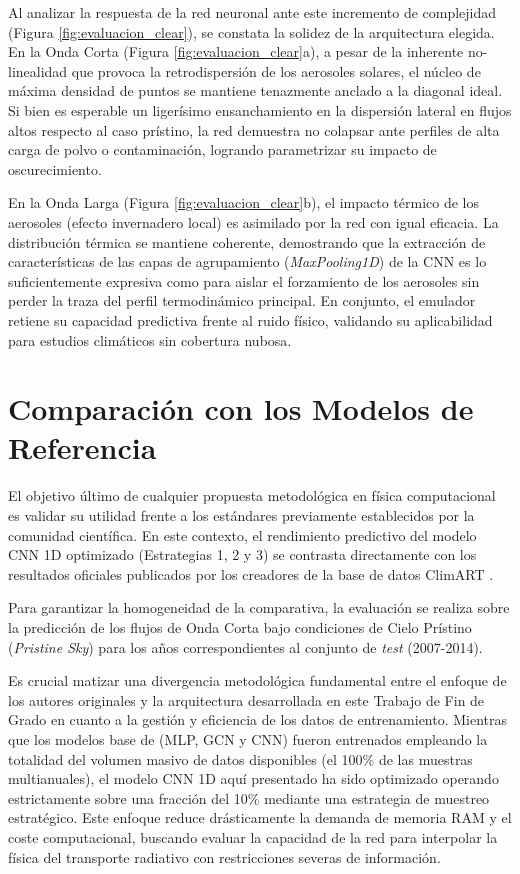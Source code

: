 \documentclass[11pt,a4paper,twoside,pdf]{article}
\numberwithin{equation}{section}
\begin{document}
\newpage

Al analizar la respuesta de la red neuronal ante este incremento de complejidad (Figura \ref{fig:evaluacion_clear}), se constata la solidez de la arquitectura elegida. 
En la Onda Corta (Figura \ref{fig:evaluacion_clear}a), a pesar de la inherente no-linealidad que provoca la retrodispersión de los aerosoles solares, el núcleo de máxima densidad de puntos se mantiene tenazmente anclado a la diagonal ideal. Si bien es esperable un ligerísimo ensanchamiento en la dispersión lateral en flujos altos respecto al caso prístino, la red demuestra no colapsar ante perfiles de alta carga de polvo o contaminación, logrando parametrizar su impacto de oscurecimiento.

En la Onda Larga (Figura \ref{fig:evaluacion_clear}b), el impacto térmico de los aerosoles (efecto invernadero local) es asimilado por la red con igual eficacia. La distribución térmica se mantiene coherente, demostrando que la extracción de características de las capas de agrupamiento (\textit{MaxPooling1D}) de la CNN es lo suficientemente expresiva como para aislar el forzamiento de los aerosoles sin perder la traza del perfil termodinámico principal. En conjunto, el emulador retiene su capacidad predictiva frente al ruido físico, validando su aplicabilidad para estudios climáticos sin cobertura nubosa.

\newpage

\section{Comparación con los Modelos de Referencia}

El objetivo último de cualquier propuesta metodológica en física computacional es validar su utilidad frente a los estándares previamente establecidos por la comunidad científica. En este contexto, el rendimiento predictivo del modelo CNN 1D optimizado (Estrategias 1, 2 y 3) se contrasta directamente con los resultados oficiales publicados por los creadores de la base de datos ClimART \cite{ClimART2021}.

Para garantizar la homogeneidad de la comparativa, la evaluación se realiza sobre la predicción de los flujos de Onda Corta bajo condiciones de Cielo Prístino (\textit{Pristine Sky}) para los años correspondientes al conjunto de \textit{test} (2007-2014).

Es crucial matizar una divergencia metodológica fundamental entre el enfoque de los autores originales y la arquitectura desarrollada en este Trabajo de Fin de Grado en cuanto a la gestión y eficiencia de los datos de entrenamiento. Mientras que los modelos base de \cite{ClimART2021} (MLP, GCN y CNN) fueron entrenados empleando la totalidad del volumen masivo de datos disponibles (el 100\% de las muestras multianuales), el modelo CNN 1D aquí presentado ha sido optimizado operando estrictamente sobre una fracción del 10\% mediante una estrategia de muestreo estratégico. Este enfoque reduce drásticamente la demanda de memoria RAM y el coste computacional, buscando evaluar la capacidad de la red para interpolar la física del transporte radiativo con restricciones severas de información.
\end{document}
